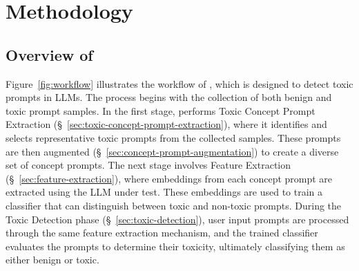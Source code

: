 \section{Methodology}
\label{sec:methodology}




\subsection{Overview of \tool{}}

Figure~\ref{fig:workflow} illustrates the workflow of \tool{}, which is designed to detect toxic prompts in LLMs. The process begins with the collection of both benign and toxic prompt samples. In the first stage, \tool{} performs Toxic Concept Prompt Extraction (\S{}~\ref{sec:toxic-concept-prompt-extraction}), where it identifies and selects representative toxic prompts from the collected samples. These prompts are then augmented (\S{}~\ref{sec:concept-prompt-augmentation}) to create a diverse set of concept prompts. The next stage involves Feature Extraction (\S{}~\ref{sec:feature-extraction}), where embeddings from each concept prompt are extracted using the LLM under test. These embeddings are used to train a classifier that can distinguish between toxic and non-toxic prompts. During the Toxic Detection phase (\S{}~\ref{sec:toxic-detection}), user input prompts are processed through the same feature extraction mechanism, and the trained classifier evaluates the prompts to determine their toxicity, ultimately classifying them as either benign or toxic.





